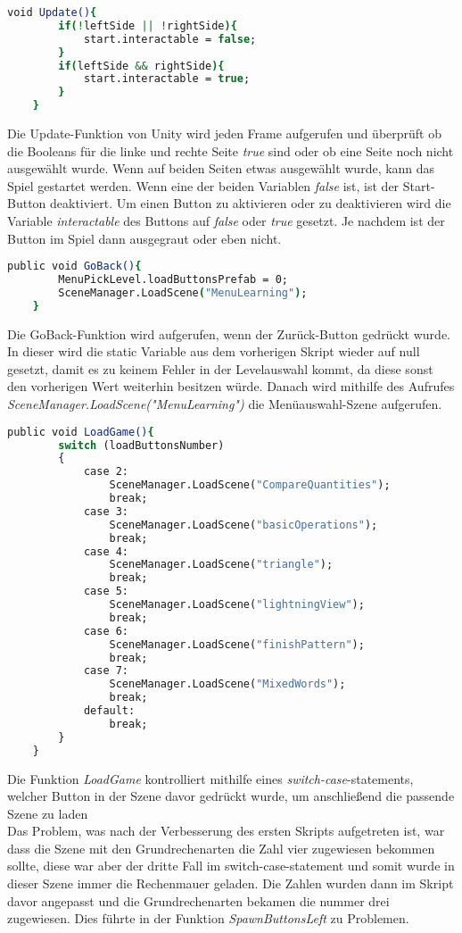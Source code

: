 \begin{lstlisting}[language=csh, caption={MenuPickLevelAdvanced.cs Update-Funktion}]
	void Update(){
		if(!leftSide || !rightSide){
			start.interactable = false;
		}
		if(leftSide && rightSide){
			start.interactable = true;
		}
	}
\end{lstlisting}
Die Update-Funktion von Unity wird jeden Frame aufgerufen und überprüft ob die Booleans für die linke und rechte Seite \textit{true} sind oder ob eine Seite noch nicht ausgewählt wurde. Wenn auf beiden Seiten etwas ausgewählt wurde, kann das Spiel gestartet werden. Wenn eine der beiden Variablen \textit{false} ist, ist der Start-Button deaktiviert. Um einen Button zu aktivieren oder zu deaktivieren wird die Variable \textit{interactable} des Buttons auf \textit{false} oder \textit{true} gesetzt. Je nachdem ist der Button im Spiel dann ausgegraut oder eben nicht.\\
\begin{lstlisting}[language=csh, caption={MenuPickLevelAdvanced.cs GoBack-Funktion}]
	public void GoBack(){
		MenuPickLevel.loadButtonsPrefab = 0;
		SceneManager.LoadScene("MenuLearning");
	}
\end{lstlisting}
Die GoBack-Funktion wird aufgerufen, wenn der Zurück-Button gedrückt wurde. In dieser wird die static Variable aus dem vorherigen Skript wieder auf null gesetzt, damit es zu keinem Fehler in der Levelauswahl kommt, da diese sonst den vorherigen Wert weiterhin besitzen würde. Danach wird mithilfe des Aufrufes \textit{SceneManager.LoadScene("MenuLearning")} die Menüauswahl-Szene aufgerufen.
\begin{lstlisting}[language=csh, caption={MenuPickLevelAdvanced.cs LoadGame-Funktion}]
	public void LoadGame(){
		switch (loadButtonsNumber)
		{
			case 2:
				SceneManager.LoadScene("CompareQuantities");
				break;
			case 3:
				SceneManager.LoadScene("basicOperations");
				break;
			case 4:
				SceneManager.LoadScene("triangle");
				break;
			case 5:
				SceneManager.LoadScene("lightningView");
				break;
			case 6:
				SceneManager.LoadScene("finishPattern");
				break;
			case 7:
				SceneManager.LoadScene("MixedWords");
				break;
			default:
				break;
		}
	}
\end{lstlisting}
Die Funktion \textit{LoadGame} kontrolliert mithilfe eines \textit{switch-case}-statements, welcher Button in der Szene davor gedrückt wurde, um anschließend die passende Szene zu laden\\
Das Problem, was nach der Verbesserung des ersten Skripts aufgetreten ist, war dass die Szene mit den Grundrechenarten die Zahl vier zugewiesen bekommen sollte, diese war aber der dritte Fall im switch-case-statement und somit wurde in dieser Szene immer die Rechenmauer geladen. Die Zahlen wurden dann im Skript davor angepasst und die Grundrechenarten bekamen die nummer drei zugewiesen. Dies führte in der Funktion \textit{SpawnButtonsLeft} zu Problemen.\\
